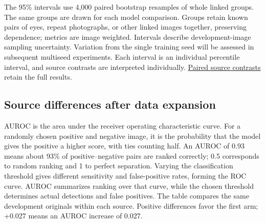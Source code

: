 \documentclass[
  10pt,
]{article}
\begin{document}
The 95\% intervals use 4,000 paired bootstrap resamples of whole linked
groups. The same groups are drawn for each model comparison. Groups
retain known pairs of eyes, repeat photographs, or other linked images
together, preserving dependence; metrics are image weighted. Intervals
describe development-image sampling uncertainty. Variation from the
single training seed will be assessed in subsequent multiseed
experiments. Each interval is an individual percentile interval, and
source contrasts are interpreted individually.
\href{paired-source-contrasts.csv}{Paired source contrasts} retain the
full results.

\subsection{Source differences after data
expansion}\label{source-differences-after-data-expansion}

AUROC is the area under the receiver operating characteristic curve. For
a randomly chosen positive and negative image, it is the probability
that the model gives the positive a higher score, with ties counting
half. An AUROC of 0.93 means about 93\% of positive--negative pairs are
ranked correctly; 0.5 corresponds to random ranking and 1 to perfect
separation. Varying the classification threshold gives different
sensitivity and false-positive rates, forming the ROC curve. AUROC
summarizes ranking over that curve, while the chosen threshold
determines actual detections and false positives. The table compares the
same development originals within each source. Positive differences
favor the first arm; +0.027 means an AUROC increase of 0.027.
\end{document}
